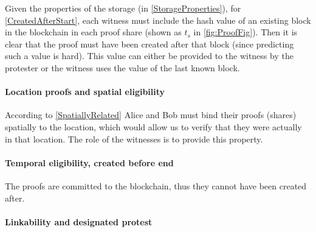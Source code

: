Given the properties of the storage (in \cref{StorageProperties}), for 
\cref{CreatedAfterStart}, each witness must include the hash value of an 
existing block in the blockchain in each proof share (shown as \(t_s\) in 
\cref{fig:ProofFig}).
Then it is clear that the proof must have been created after that block (since 
predicting such a value is hard).
This value can either be provided to the witness by the protester or the witness 
uses the value of the last known block.

\paragraph{Location proofs and spatial eligibility}

According to \cref{SpatiallyRelated} Alice and Bob must bind their proofs 
(shares) spatially to the location, which would allow us to verify that they 
were actually in that location.
The role of the witnesses is to provide this property.

\paragraph{Temporal eligibility, created before end}

The proofs are committed to the blockchain, thus they cannot have been created 
after.

\paragraph{Linkability and designated protest}

